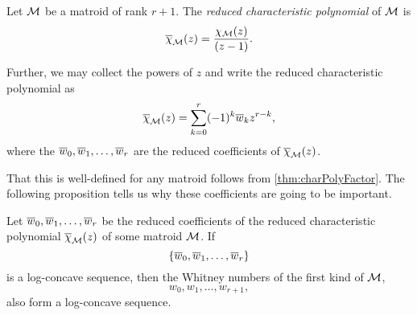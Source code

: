 \documentclass[12pt,oneside]{../../sfsuthesis}
\begin{document}
\begin{definition}\label{def:reducedCharPoly}
    Let \( \mathcal{M} \) be a matroid of rank \( r + 1 \).
    The \emph{reduced characteristic polynomial} of \( \mathcal{M} \) is
    \[
        \overline{\chi}_{\mathcal{M}}(z) = \frac{\chi_{\mathcal{M}}(z)}{(z-1)}.
    \]

    Further, we may collect the powers of \( z \) and write the reduced characteristic polynomial as
    \[
        \overline{\chi}_{\mathcal{M}}(z) = \sum_{k=0}^r (-1)^k\overline{w}_k z^{r-k},
    \]
    where the \( \overline{w}_0, \overline{w}_1, \dots, \overline{w}_r \) are the reduced coefficients of \( \overline{\chi}_{\mathcal{M}}(z) \).
\end{definition}
That this is well-defined for any matroid follows from \th\ref{thm:charPolyFactor}.
The following proposition tells us why these coefficients are going to be important.
\begin{lemma}\th\label{thm:reducedImpliesOriginal}
    Let  \( \overline{w}_0, \overline{w}_1, \dots, \overline{w}_r \) be the reduced coefficients of the reduced characteristic polynomial \( \overline{\chi}_{\mathcal{M}}(z) \) of some matroid \( \mathcal{M} \).
    If
    \[
        \{\overline{w}_0, \overline{w}_1, \dots, \overline{w}_r \}
    \]
    is a log-concave sequence, then the Whitney numbers of the first kind of \( \mathcal{M} \),
    \[
        w_0, w_1, \dots, w_{r+1},
    \]
    also form a log-concave sequence.
\end{lemma}
\end{document}
